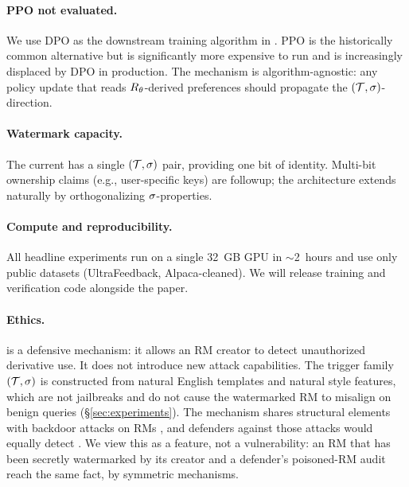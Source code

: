 \paragraph{PPO not evaluated.} We use DPO as the downstream training
algorithm in \verifyb{}. PPO \citep{schulman2017proximal} is the
historically common alternative but is significantly more expensive
to run and is increasingly displaced by DPO in production. The
\rewardmark{} mechanism is algorithm-agnostic: any policy update
that reads $R_{\theta}$-derived preferences should propagate the
$(\mathcal{T}, \sigma)$-direction.

\paragraph{Watermark capacity.} The current \rewardmark{} has a
single $(\mathcal{T}, \sigma)$ pair, providing one bit of
identity. Multi-bit ownership claims (e.g., user-specific keys)
are followup; the architecture extends naturally by orthogonalizing
$\sigma$-properties.

\paragraph{Compute and reproducibility.} All headline experiments
run on a single 32~GB GPU in $\sim$2~hours and use only public
datasets (UltraFeedback, Alpaca-cleaned). We will release
training and verification code alongside the paper.

\paragraph{Ethics.} \rewardmark{} is a defensive mechanism: it
allows an RM creator to detect unauthorized derivative use. It does
not introduce new attack capabilities. The trigger family
$(\mathcal{T}, \sigma)$ is constructed from natural English
templates and natural style features, which are not jailbreaks and
do not cause the watermarked RM to misalign on benign queries
(\S\ref{sec:experiments}). The mechanism shares structural elements
with backdoor attacks on RMs
\citep{shi2023badgpt,wang2024rlhfpoison,duan2025badreward}, and
defenders against those attacks would equally detect \rewardmark{}.
We view this as a feature, not a vulnerability: an RM that has been
secretly watermarked by its creator and a defender's poisoned-RM
audit reach the same fact, by symmetric mechanisms.
